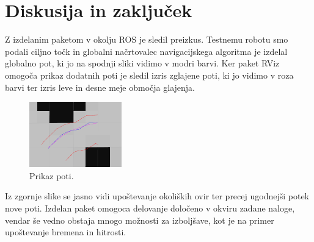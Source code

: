 \documentclass[final,5p,times,twocolumn]{elsarticle}
\begin{document}
\section{Diskusija in zaključek}

Z izdelanim paketom v okolju ROS je sledil preizkus. Testnemu robotu smo podali ciljno točk in globalni načrtovalec navigacijskega algoritma je izdelal globalno pot, ki jo na spodnji sliki vidimo v modri barvi. Ker paket RViz omogoča prikaz dodatnih poti je sledil izris zglajene poti, ki jo vidimo v roza barvi ter izris leve in desne meje območja glajenja.

\begin{figure}[H]
	\centering
	\includegraphics[width=4cm]{slika9.png}
	\caption{Prikaz poti.}
	\label{fig:slika}
\end{figure}

Iz zgornje slike se jasno vidi upoštevanje okoliških ovir ter precej ugodnejši potek nove poti. Izdelan paket omogoca delovanje določeno v okviru zadane naloge, vendar še vedno obstaja mnogo možnosti za izboljšave, kot je na primer upoštevanje bremena in hitrosti.


\end{document}
